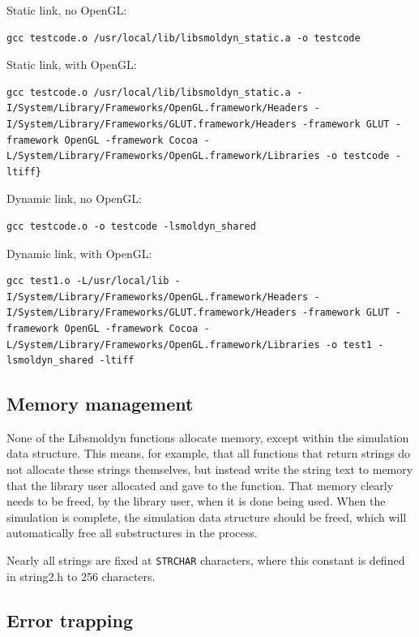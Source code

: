 \documentclass {book}
\newcommand {\ttt} {\texttt}
\begin{document}
Static link, no OpenGL:
\begin{lstlisting}[style=SSAC]
gcc testcode.o /usr/local/lib/libsmoldyn_static.a -o testcode
\end{lstlisting}

Static link, with OpenGL:
\begin{lstlisting}[style=SSAC]
gcc testcode.o /usr/local/lib/libsmoldyn_static.a -I/System/Library/Frameworks/OpenGL.framework/Headers -I/System/Library/Frameworks/GLUT.framework/Headers -framework GLUT -framework OpenGL -framework Cocoa -L/System/Library/Frameworks/OpenGL.framework/Libraries -o testcode -ltiff}
\end{lstlisting}

Dynamic link, no OpenGL:
\begin{lstlisting}[style=SSAC]
gcc testcode.o -o testcode -lsmoldyn_shared
\end{lstlisting}

Dynamic link, with OpenGL:
\begin{lstlisting}[style=SSAC]
gcc test1.o -L/usr/local/lib -I/System/Library/Frameworks/OpenGL.framework/Headers -I/System/Library/Frameworks/GLUT.framework/Headers -framework GLUT -framework OpenGL -framework Cocoa -L/System/Library/Frameworks/OpenGL.framework/Libraries -o test1 -lsmoldyn_shared -ltiff
\end{lstlisting}


\subsection*{Memory management}

None of the Libsmoldyn functions allocate memory, except within the simulation data structure. This means, for example, that all functions that return strings do not allocate these strings themselves, but instead write the string text to memory that the library user allocated and gave to the function. That memory clearly needs to be freed, by the library user, when it is done being used. When the simulation is complete, the simulation data structure should be freed, which will automatically free all substructures in the process.

Nearly all strings are fixed at \ttt{STRCHAR} characters, where this constant is defined in string2.h to 256 characters.


\subsection*{Error trapping}
\end{document}
